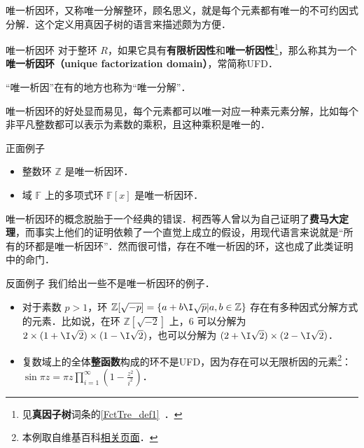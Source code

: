 


唯一析因环，又称唯一分解整环，顾名思义，就是每个元素都有唯一的不可约因式分解．这个定义用真因子树的语言来描述颇为方便．

\begin{definition}{唯一析因环}
对于整环 $R$，如果它具有\textbf{有限析因性}和\textbf{唯一析因性}\footnote{见\textbf{真因子树}词条的\autoref{FctTre_def1}~．}，那么称其为一个\textbf{唯一析因环（unique factorization domain）}，常简称UFD．
\end{definition}

“唯一析因”在有的地方也称为“唯一分解”．

唯一析因环的好处显而易见，每个元素都可以唯一对应一种素元素分解，比如每个非平凡整数都可以表示为素数的乘积，且这种乘积是唯一的．

\begin{example}{正面例子}
\begin{itemize}
\item 整数环 $\mathbb{Z}$ 是唯一析因环．
\item 域 $\mathbb{F}$ 上的多项式环 $\mathbb{F}[x]$ 是唯一析因环．
\end{itemize}
\end{example}

唯一析因环的概念脱胎于一个经典的错误．柯西等人曾以为自己证明了\textbf{费马大定理}，而事实上他们的证明依赖了一个直觉上成立的假设，用现代语言来说就是“所有的环都是唯一析因环”．然而很可惜，存在不唯一析因的环，这也成了此类证明中的命门．

\begin{example}{反面例子}
我们给出一些不是唯一析因环的例子．
\begin{itemize}
\item 对于素数 $p>1$，环 $\mathbb{Z}[\sqrt{-p}]=\{a+b\I\sqrt{p}|a, b\in\mathbb{Z}\}$ 存在有多种因式分解方式的元素．比如说，在环 $\mathbb{Z}[\sqrt{-2}]$ 上，$6$ 可以分解为 $2\times (1+\I\sqrt{2})\times(1-\I\sqrt{2})$，也可以分解为 $(2+\I\sqrt{2})\times(2-\I\sqrt{2})$．
\item 复数域上的全体\textbf{整函数}构成的环不是UFD，因为存在可以无限析因的元素\footnote{本例取自维基百科\href{https://en.wikipedia.org/wiki/Unique_factorization_domain}{相关页面}．}：$\sin{\pi z=\pi z\prod\limits_{i=1}^\infty(1-\frac{z^2}{i^2})}$．
\end{itemize}
\end{example}

